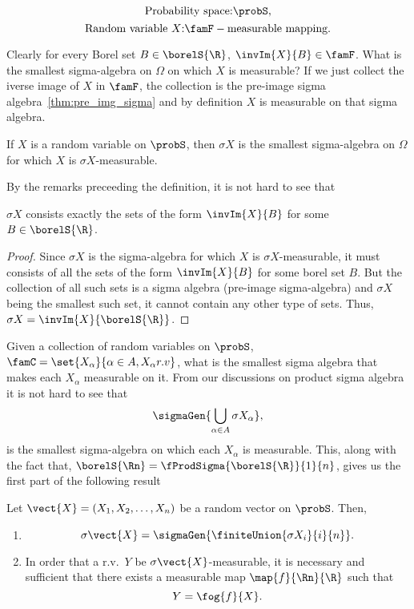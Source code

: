 \[\text{Probability space:} \probS,\]
\[\text{Random variable $X$:}\famF-\text{measurable mapping}.\]

Clearly for every Borel set $B \in \borelS{\R}$, $\invIm{X}{B} \in \famF$. What is the smallest sigma-algebra
on $\Omega$ on which $X$ is measurable? If we just collect the iverse image of $X$ in $\famF$, the collection
is the pre-image sigma algebra~\ref{thm:pre_img_sigma} and by definition $X$ is measurable on that sigma
algebra. 

\begin{Definition}
    If $X$ is a random variable on $\probS$, then $\sigma{X}$ is the smallest 
    sigma-algebra on $\Omega$ for which $X$
    is $\sigma{X}$-measurable.
\end{Definition}
By the remarks preceeding the definition, it is not hard to see that
\begin{Proposition}
    $\sigma{X}$ consists exactly the sets of the form $\invIm{X}{B}$ for some $B \in \borelS{\R}$. 
\end{Proposition}
\begin{proof}
    Since $\sigma{X}$ is the sigma-algebra for which $X$ is $\sigma{X}$-measurable, it must consists of all the
    sets of the form $\invIm{X}{B}$ for some borel set $B$. But the collection of all such sets is a sigma
    algebra (pre-image sigma-algebra) and $\sigma{X}$ being the smallest such set, it cannot contain any other
    type of sets. Thus, $\sigma{X} = \invIm{X}{\borelS{\R}}$.
\end{proof}
\begin{Remark}
Given a collection of random variables on $\probS$, $\famC=\set{X_{\alpha}}{\alpha \in A, X_{\alpha} r.v}$,
what is the smallest sigma algebra that makes each $X_{\alpha}$ measurable on it. From our discussions on
product sigma algebra it is not hard to see that
\[\sigmaGen{\bigcup\limits_{\alpha \in A}\sigma{X_\alpha}},\]
is the smallest sigma-algebra on which each $X_{\alpha}$ is measurable. This, along with the fact that,
$\borelS{\Rn} = \fProdSigma{\borelS{\R}}{1}{n}$, gives us the first part of the following result
\end{Remark}
\begin{Theorem}
    Let $\vect{X} = (X_1,X_2,\dots,X_n)$ be a random vector on $\probS$. Then,
    \begin{enumerate}
	\item
	    \[\sigma{\vect{X}} = \sigmaGen{\finiteUnion{\sigma{X_i}}{i}{n}}.\]
	\item
	    In order that a r.v.~$Y$ be $\sigma{\vect{X}}$-measurable, it is necessary and sufficient that
	    there exists a measurable map $\map{f}{\Rn}{\R}$ such that
	    \[Y = \fog{f}{X}. \]
    \end{enumerate}
\end{Theorem}



